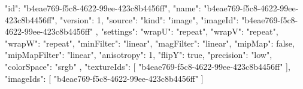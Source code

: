 {
  "id": "b4eae769-f5c8-4622-99ee-423c8b4456ff",
  "name": "b4eae769-f5c8-4622-99ee-423c8b4456ff",
  "version": 1,
  "source": {
    "kind": "image",
    "imageId": "b4eae769-f5c8-4622-99ee-423c8b4456ff"
  },
  "settings": {
    "wrapU": "repeat",
    "wrapV": "repeat",
    "wrapW": "repeat",
    "minFilter": "linear",
    "magFilter": "linear",
    "mipMap": false,
    "mipMapFilter": "linear",
    "anisotropy": 1,
    "flipY": true,
    "precision": "low",
    "colorSpace": "srgb"
  },
  "textureIds": [
    "b4eae769-f5c8-4622-99ee-423c8b4456ff"
  ],
  "imageIds": [
    "b4eae769-f5c8-4622-99ee-423c8b4456ff"
  ]
}

